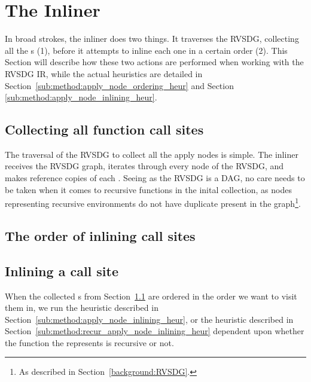 
\clearpage
\section{The Inliner}


In broad strokes, the inliner does two things. It traverses the RVSDG,
collecting all the \applyNode s (1), before it attempts to inline each one in a
certain order (2). This Section will describe how these two actions are
performed when working with the RVSDG IR, while the actual heuristics are
detailed in Section~\ref{sub:method:apply_node_ordering_heur} and Section
\ref{sub:method:apply_node_inlining_heur}.

\subsection{Collecting all function call sites}
\label{sub:scheme:collecting_apply_nodes}

The traversal of the RVSDG to collect all the apply nodes is simple. The inliner
receives the RVSDG graph, iterates through every node of the RVSDG, and makes
reference copies of each \applyNode . Seeing as the RVSDG is a DAG, no care
needs to be taken when it comes to recursive functions in the inital collection,
as nodes representing recursive environments do not have duplicate \applyNode
present in the graph\footnote{As described in Section~\ref{background:RVSDG}.}.

\subsection{The order of inlining call sites}
\label{sub:scheme:ordering_apply_nodes}


\subsection{Inlining a call site}
\label{sub:scheme:inlining_apply_nodes}

When the collected \applyNode s from
Section~\ref{sub:scheme:collecting_apply_nodes} are ordered in the order we want
to visit them in, we run the heuristic described in
Section~\ref{sub:method:apply_node_inlining_heur}, or the heuristic described in
Section~\ref{sub:method:recur_apply_node_inlining_heur} dependent upon whether
the function the \applyNode represents is recursive or not.

